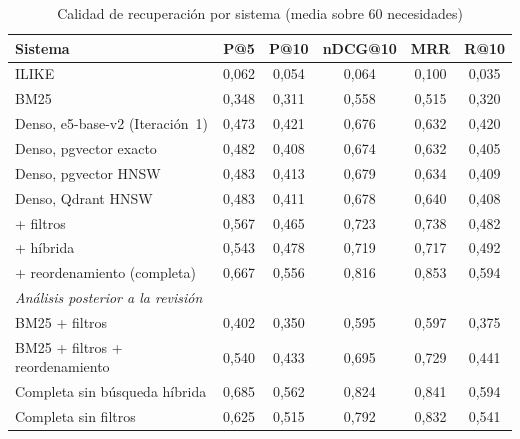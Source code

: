 \begin{table}[htbp!]
    \centering
    \caption{Calidad de recuperación por sistema (media sobre 60 necesidades)}
    \label{tab:res-pe1-global}
    \begin{tabular}{|l|c|c|c|c|c|}
        \hline
        \textbf{Sistema} & \textbf{P@5} & \textbf{P@10} & \textbf{nDCG@10} & \textbf{MRR} & \textbf{R@10} \\
        \hline
        ILIKE & 0{,}062 & 0{,}054 & 0{,}064 & 0{,}100 & 0{,}035 \\
        \hline
        BM25 & 0{,}348 & 0{,}311 & 0{,}558 & 0{,}515 & 0{,}320 \\
        \hline
        Denso, e5-base-v2 (Iteración~1) & 0{,}473 & 0{,}421 & 0{,}676 & 0{,}632 & 0{,}420 \\
        \hline
        Denso, pgvector exacto & 0{,}482 & 0{,}408 & 0{,}674 & 0{,}632 & 0{,}405 \\
        \hline
        Denso, pgvector HNSW & 0{,}483 & 0{,}413 & 0{,}679 & 0{,}634 & 0{,}409 \\
        \hline
        Denso, Qdrant HNSW & 0{,}483 & 0{,}411 & 0{,}678 & 0{,}640 & 0{,}408 \\
        \hline
        + filtros & 0{,}567 & 0{,}465 & 0{,}723 & 0{,}738 & 0{,}482 \\
        \hline
        + híbrida & 0{,}543 & 0{,}478 & 0{,}719 & 0{,}717 & 0{,}492 \\
        \hline
        + reordenamiento (completa) & 0{,}667 & 0{,}556 & 0{,}816 & 0{,}853 & 0{,}594 \\
        \hline
        \multicolumn{6}{|l|}{\textit{Análisis posterior a la revisión}} \\
        \hline
        BM25 + filtros & 0{,}402 & 0{,}350 & 0{,}595 & 0{,}597 & 0{,}375 \\
        \hline
        BM25 + filtros + reordenamiento & 0{,}540 & 0{,}433 & 0{,}695 & 0{,}729 & 0{,}441 \\
        \hline
        Completa sin búsqueda híbrida & 0{,}685 & 0{,}562 & 0{,}824 & 0{,}841 & 0{,}594 \\
        \hline
        Completa sin filtros & 0{,}625 & 0{,}515 & 0{,}792 & 0{,}832 & 0{,}541 \\
        \hline
    \end{tabular}
\end{table}
